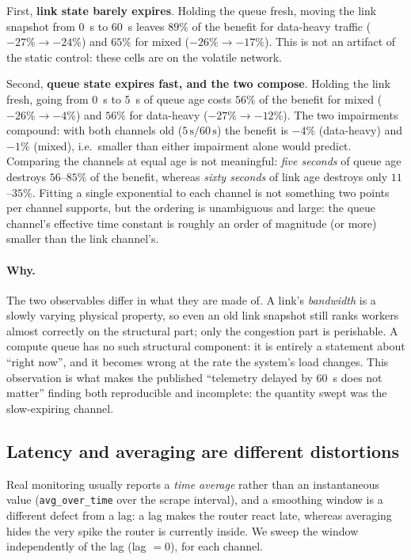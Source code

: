 First, \textbf{link state barely expires}. Holding the queue fresh, moving the link snapshot from
\SI{0}{\second} to \SI{60}{\second} leaves $89\%$ of the benefit for data-heavy traffic
($-27\%\rightarrow-24\%$) and $65\%$ for mixed ($-26\%\rightarrow-17\%$). This is not an
artifact of the static control: these cells are on the volatile network.

Second, \textbf{queue state expires fast, and the two compose}. Holding the link fresh, going
from \SI{0}{\second} to \SI{5}{\second} of queue age costs $56\%$ of the benefit for mixed
($-26\%\rightarrow-4\%$) and $56\%$ for data-heavy ($-27\%\rightarrow-12\%$). The two impairments
compound: with both channels old ($5\,\text{s}/60\,\text{s}$) the benefit is $-4\%$ (data-heavy)
and $-1\%$ (mixed), i.e.~smaller than either impairment alone would predict.
Comparing the channels at equal age is not meaningful: \emph{five seconds} of queue age destroys
$56$--$85\%$ of the benefit, whereas \emph{sixty seconds} of link age destroys only
$11$--$35\%$. Fitting a single exponential to each channel is not something two points per
channel supports, but the ordering is unambiguous and large: the queue channel's effective time
constant is roughly an order of magnitude (or more) smaller than the link channel's.

\paragraph{Why.} The two observables differ in what they are made of. A link's \emph{bandwidth}
is a slowly varying physical property, so even an old link snapshot still ranks workers almost
correctly on the structural part; only the congestion part is perishable. A compute queue has no
such structural component: it is entirely a statement about ``right now'', and it becomes wrong
at the rate the system's load changes. This observation is what makes the published
``telemetry delayed by \SI{60}{\second} does not matter'' finding \cite{aegis} both reproducible
and incomplete: the quantity swept was the slow-expiring channel.

\subsection{Latency and averaging are different distortions}
Real monitoring usually reports a \emph{time average} rather than an instantaneous value
(\texttt{avg\_over\_time} over the scrape interval), and a smoothing window is a different defect
from a lag: a lag makes the router react late, whereas averaging hides the very spike the router
is currently inside. We sweep the window independently of the lag (lag $=0$), for each channel.

